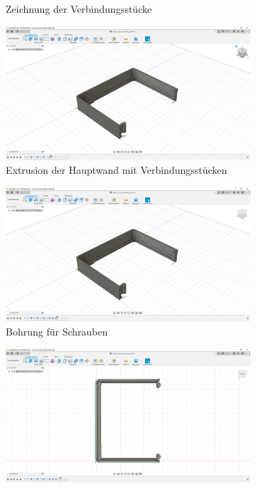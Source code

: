 \begin{figure}[H]
\begin{subfigure}[t]{.3\linewidth}
		\caption[Zeichnung der Verbindungsstücke]{Zeichnung der Verbindungsstücke}
		\label{fig:design-left-06}
	\end{subfigure}
	\begin{subfigure}[t]{.3\linewidth}
		\includegraphics[width=\linewidth]{img/konstruktion_gehaeuse_links_007.png}
		\caption[Extrusion der Hauptwand mit Verbindungsstücken]{Extrusion der Hauptwand mit Verbindungsstücken}
		\label{fig:design-left-07}
	\end{subfigure}
	\begin{subfigure}[t]{.3\linewidth}
		\includegraphics[width=\linewidth]{img/konstruktion_gehaeuse_links_008.png}
		\caption[Bohrung für Schrauben]{Bohrung für Schrauben}
		\label{fig:design-left-08}
	\end{subfigure}
	\begin{subfigure}[t]{.3\linewidth}
		\includegraphics[width=\linewidth]{img/konstruktion_gehaeuse_links_009.png}

\end{subfigure}
\end{figure}
